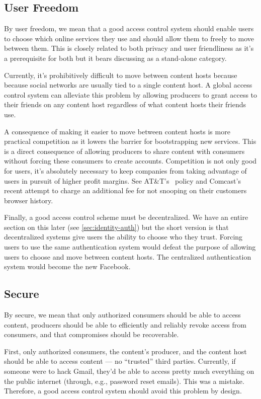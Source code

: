\documentclass[pdftex,12pt,a4papaer,twoside,notitlepage]{report}
\begin{document}
\subsection{User Freedom}
\label{sec:goal-freedom}

By user freedom, we mean that a good access control system should enable users
to choose which online services they use and should allow them to freely to move
between them. This is closely related to both privacy and user friendliness as
it's a prerequisite for both but it bears discussing as a stand-alone category.

Currently, it's prohibitively difficult to move between content hosts because
because social networks are usually tied to a single content host. A global
access control system can alleviate this problem by allowing producers to grant
access to their friends on any content host regardless of what content hosts
their friends use.

A consequence of making it easier to move between content hosts is more
practical competition as it lowers the barrier for bootstrapping new services.
This is a direct consequence of allowing producers to share content with
consumers without forcing these consumers to create accounts. Competition is not
only good for users, it's absolutely necessary to keep companies from taking
advantage of users in pursuit of higher profit margins. See AT\&T's~\cite{att}
policy and Comcast's~\cite{comcast} recent attempt to charge an additional fee
for not snooping on their customers browser history.

Finally, a good access control scheme must be decentralized. We have an entire
section on this later (see \cref{sec:identity-auth}) but the short version is
that decentralized systems give users the ability to choose who they trust.
Forcing users to use the same authentication system would defeat the purpose of
allowing users to choose and move between content hosts. The centralized
authentication system would become the new Facebook.

\subsection{Secure}

By secure, we mean that only authorized consumers should be able to access
content, producers should be able to efficiently and reliably revoke access from
consumers, and that compromises should be recoverable.

First, only authorized consumers, the content's producer, and the content host
should be able to access content --- no ``trusted'' third parties. Currently, if
someone were to hack Gmail, they'd be able to access pretty much everything on
the public internet (through, e.g., password reset emails). This was a mistake.
Therefore, a good access control system should avoid this problem by design.
\end{document}
